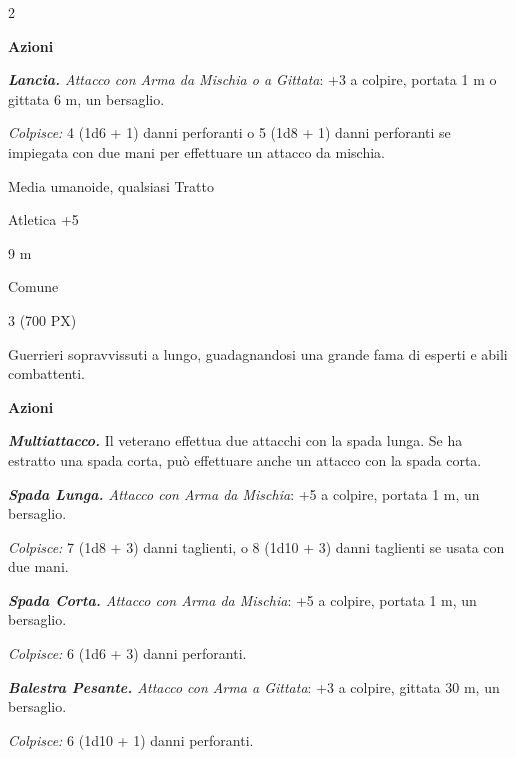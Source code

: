 \begin{multicols}{2}
{\textbf{Azioni}

\emph{\textbf{Lancia.} Attacco con Arma da Mischia o a Gittata}: +3 a colpire, portata 1 m o gittata 6 m, un bersaglio.

\emph{Colpisce:} 4 (1d6 + 1) danni perforanti o 5 (1d8 + 1) danni perforanti se impiegata con due mani per effettuare un attacco da mischia.

\begin{description}[noitemsep, topsep=0pt, parsep=0pt, partopsep=0pt, itemsep=1pt, leftmargin=2.35cm,  labelwidth=2.2cm, itemindent=0cm, listparindent=0pt] %
\setlength{\baselineskip}{10pt}
\item[\textbf{Taglia/Tipo}] Media umanoide, qualsiasi Tratto
\item[\textbf{Caratt.}] 
\item[\textbf{Punti Ferita}] 
\item[\textbf{Comp.}] Atletica +5
\item[\textbf{Tiri Salvez.}] 
\item[\textbf{Movimento}] 9 m
\item[\textbf{Linguaggi}] Comune
\item[\textbf{Sfida}] 3 (700 PX)
\end{description}
\smallskip

Guerrieri sopravvissuti a lungo, guadagnandosi una grande fama di esperti e abili combattenti.

\textbf{Azioni}

\emph{\textbf{Multiattacco.}} Il veterano effettua due attacchi con la spada lunga. Se ha estratto una spada corta, può effettuare anche un attacco con la spada corta.

\emph{\textbf{Spada Lunga.} Attacco con Arma da Mischia}: +5 a colpire, portata 1 m, un bersaglio.

\emph{Colpisce:} 7 (1d8 + 3) danni taglienti, o 8 (1d10 + 3) danni taglienti se usata con due mani.

\emph{\textbf{Spada Corta.} Attacco con Arma da Mischia}: +5 a colpire, portata 1 m, un bersaglio.

\emph{Colpisce:} 6 (1d6 + 3) danni perforanti.

\emph{\textbf{Balestra Pesante.} Attacco con Arma a Gittata}: +3 a colpire, gittata 30 m, un bersaglio.

\emph{Colpisce:} 6 (1d10 + 1) danni perforanti.

}
\end{multicols}
